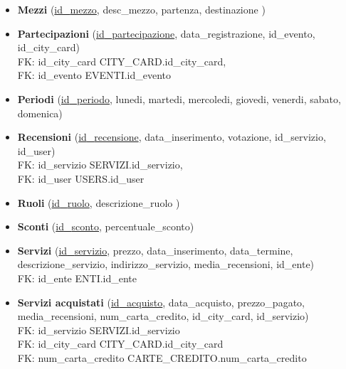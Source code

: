 \begin{itemize}
    \item 
    \textbf{Mezzi}
    (\underline{id{\_}mezzo},
    desc{\_}mezzo,
    partenza,
    destinazione
    )

    \item 
    \textbf{Partecipazioni}
    (\underline{id{\_}partecipazione},
    data{\_}registrazione,
    id{\_}evento,
    id{\_}city{\_}card)\\
    FK: id{\_}city{\_}card \textrightarrow CITY{\_}CARD.id{\_}city{\_}card,\\
    FK: id{\_}evento \textrightarrow EVENTI.id{\_}evento

    \item   
    \textbf{Periodi}
    (\underline{id{\_}periodo},
    lunedi,
    martedi,
    mercoledi,
    giovedi,
    venerdi,
    sabato,
    domenica)

    \item 
    \textbf{Recensioni}
    (\underline{id{\_}recensione},
    data{\_}inserimento,
    votazione,
    id{\_}servizio,
    id{\_}user)\\
    FK: id{\_}servizio \textrightarrow SERVIZI.id{\_}servizio,\\
    FK: id{\_}user \textrightarrow USERS.id{\_}user

    \item 
    \textbf{Ruoli}
    (\underline{id{\_}ruolo},
    descrizione{\_}ruolo
    )

    \item 
    \textbf{Sconti}
    (\underline{id{\_}sconto},
    percentuale{\_}sconto)

    \item 
    \textbf{Servizi}
    (\underline{id{\_}servizio},
    prezzo,
    data{\_}inserimento,
    data{\_}termine,
    descrizione{\_}servizio,
    indirizzo{\_}servizio,
    media{\_}recensioni,
    id{\_}ente)\\
    FK: id{\_}ente \textrightarrow ENTI.id{\_}ente
    
    \item 
    \textbf{Servizi acquistati}
    (\underline{id{\_}acquisto},
    data{\_}acquisto,
    prezzo{\_}pagato,
    media{\_}recensioni,
    num{\_}carta{\_}credito,
    id{\_}city{\_}card,
    id{\_}servizio)\\
    FK: id{\_}servizio \textrightarrow SERVIZI.id{\_}servizio\\
    FK: id{\_}city{\_}card \textrightarrow CITY{\_}CARD.id{\_}city{\_}card\\
    FK: num{\_}carta{\_}credito \textrightarrow CARTE{\_}CREDITO.num{\_}carta{\_}credito
    

\end{itemize}
